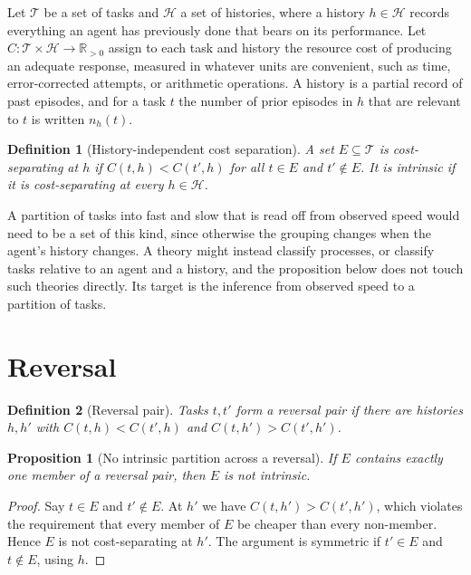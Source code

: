 \documentclass[11pt]{report}
\newcommand{\T}{\mathcal{T}}
\newcommand{\Hh}{\mathcal{H}}
\newcommand{\R}{\mathbb{R}}
\newtheorem{definition}{Definition}[chapter]
\newtheorem{proposition}{Proposition}[chapter]
\theoremstyle{remark}
\theoremstyle{definition}
\begin{document}
Let $\T$ be a set of tasks and $\Hh$ a set of histories, where a history $h\in\Hh$ records everything an agent has previously done that bears on its performance. Let $C:\T\times\Hh\to\R_{>0}$ assign to each task and history the resource cost of producing an adequate response, measured in whatever units are convenient, such as time, error-corrected attempts, or arithmetic operations. A history is a partial record of past episodes, and for a task $t$ the number of prior episodes in $h$ that are relevant to $t$ is written $n_h(t)$.

\begin{definition}[History-independent cost separation]
A set $E\subseteq\T$ is \emph{cost-separating at $h$} if $C(t,h)<C(t',h)$ for all $t\in E$ and $t'\notin E$. It is \emph{intrinsic} if it is cost-separating at every $h\in\Hh$.
\end{definition}

A partition of tasks into fast and slow that is read off from observed speed would need to be a set of this kind, since otherwise the grouping changes when the agent's history changes. A theory might instead classify processes, or classify tasks relative to an agent and a history, and the proposition below does not touch such theories directly. Its target is the inference from observed speed to a partition of tasks.

\section{Reversal}

\begin{definition}[Reversal pair]
Tasks $t,t'$ form a \emph{reversal pair} if there are histories $h,h'$ with $C(t,h)<C(t',h)$ and $C(t,h')>C(t',h')$.
\end{definition}

\begin{proposition}[No intrinsic partition across a reversal]\label{prop:reversal}
If $E$ contains exactly one member of a reversal pair, then $E$ is not intrinsic.
\end{proposition}

\begin{proof}
Say $t\in E$ and $t'\notin E$. At $h'$ we have $C(t,h')>C(t',h')$, which violates the requirement that every member of $E$ be cheaper than every non-member. Hence $E$ is not cost-separating at $h'$. The argument is symmetric if $t'\in E$ and $t\notin E$, using $h$.
\end{proof}
\end{document}
